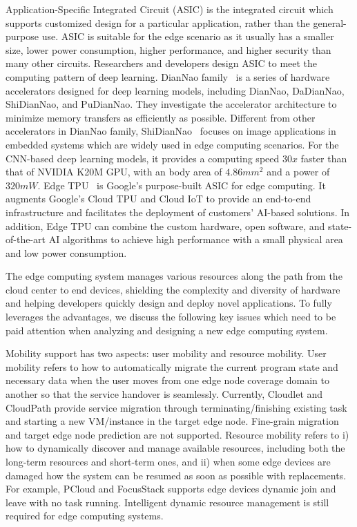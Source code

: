 Application-Specific Integrated Circuit (ASIC) is the integrated circuit which supports customized design for a particular application, rather than the general-purpose use. ASIC is suitable for the edge scenario as it usually has a smaller size, lower power consumption, higher performance, and higher security than many other circuits. Researchers and developers design ASIC to meet the computing pattern of deep learning.
DianNao family~ is a series of hardware accelerators designed for deep learning models, including DianNao, DaDianNao, ShiDianNao, and PuDianNao. They investigate the accelerator architecture to minimize memory transfers as efficiently as possible. Different from other accelerators in DianNao family, ShiDianNao~ focuses on image applications in embedded systems which are widely used in edge computing scenarios. For the CNN-based deep learning models, it provides a computing speed $30x$ faster than that of NVIDIA K20M GPU, with an body area of $4.86 mm^2$ and a power of $320 mW$.
Edge TPU~ is Google's purpose-built ASIC for edge computing. It augments Google's Cloud TPU and Cloud IoT to provide an end-to-end infrastructure and facilitates the deployment of customers' AI-based solutions. In addition, Edge TPU can combine the custom hardware, open software, and state-of-the-art AI algorithms to achieve high performance with a small physical area and low power consumption.

\label{sec:key-design-issues}
The edge computing system manages various resources along the path from the cloud center to end devices, shielding the complexity and diversity of hardware and helping developers quickly design and deploy novel applications. To fully leverages the advantages, we discuss the following key issues which need to be paid attention when analyzing and designing a new edge computing system.

Mobility support has two aspects: user mobility and resource mobility. User mobility refers to how to automatically migrate the current program state and necessary data when the user moves from one edge node coverage domain to another so that the service handover is seamlessly. Currently, Cloudlet and CloudPath provide service migration through terminating/finishing existing task and starting a new VM/instance in the target edge node. Fine-grain migration and target edge node prediction are not supported. Resource mobility refers to i) how to dynamically discover and manage available resources, including both the long-term resources and short-term ones, and ii) when some edge devices are damaged how the system can be resumed as soon as possible with replacements. For example, PCloud and FocusStack supports edge devices dynamic join and leave with no task running. Intelligent dynamic resource management is still required for edge computing systems.

